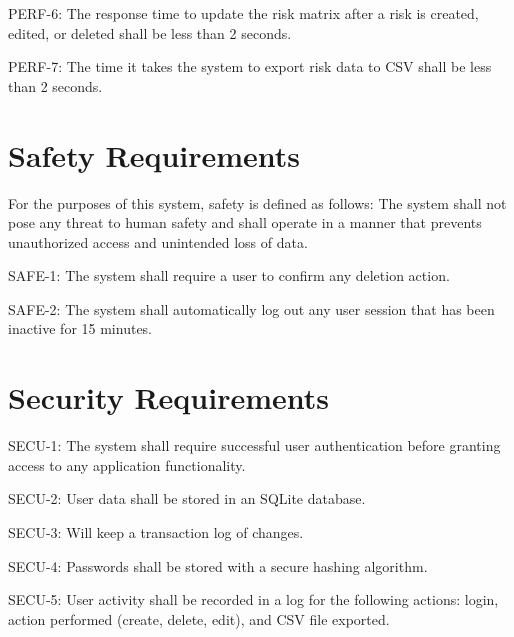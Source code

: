 \documentclass[letterpaper,12pt,oneside,listof=totoc,parskip=full]{scrreprt}
\begin{document}
PERF-6:     The response time to update the risk matrix after a risk is created, edited, or deleted shall be less than 2 seconds.

PERF-7:     The time it takes the system to export risk data to CSV shall be less than 2 seconds.


\section{Safety Requirements}
For the purposes of this system, safety is defined as follows: The system shall not pose any threat to human safety and shall operate in a manner that prevents unauthorized access and unintended loss of data.

SAFE-1:     The system shall require a user to confirm any deletion action.

SAFE-2:     The system shall automatically log out any user session that has been inactive for 15 minutes.

%
%

\section{Security Requirements}

SECU-1:     The system shall require successful user authentication before granting access to any application functionality.

SECU-2:     User data shall be stored in an SQLite database.

SECU-3:     Will keep a transaction log of changes.

SECU-4:     Passwords shall be stored with a secure hashing algorithm.

SECU-5:     User activity shall be recorded in a log for the following actions: login, action performed (create, delete, edit), and CSV file exported.
\end{document}
